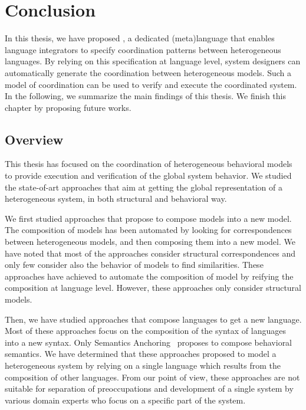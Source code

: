 \chapter{Conclusion}
\label{ch:conclusions}
In this thesis, we have proposed \bcool, a dedicated (meta)language that enables language integrators to specify coordination patterns between heterogeneous languages. By relying on this specification at language level, system designers can automatically generate the coordination between heterogeneous models. Such a model of coordination can be used to verify and execute the coordinated system. In the following, we summarize the main findings of this thesis. We finish this chapter by proposing future works. 

\section{Overview}
	
This thesis has focused on the coordination of heterogeneous behavioral models to provide execution and verification of the global system behavior. We studied the state-of-art approaches that aim at getting the global representation of a heterogeneous system, in both structural and behavioral way. 

We first studied approaches that propose to compose models into a new model. The composition of models has been automated by looking for correspondences between heterogeneous models, and then composing them into a new model. We have noted that most of the approaches consider structural correspondences and only few consider also the behavior of models to find similarities. These approaches have achieved to automate the composition of model by reifying the composition at language level. However, these approaches only consider structural models.  

Then, we have studied approaches that compose languages to get a new language. Most of these approaches focus on the composition of the syntax of languages into a new syntax. Only Semantics Anchoring~\cite{semanticsanchoring} proposes to compose behavioral semantics. We have determined that these approaches proposed to model a heterogeneous system by relying on a single language which results from the composition of other languages. From our point of view, these approaches are not suitable for separation of preoccupations and development of a single system by various domain experts who focus on a specific part of the system. 

